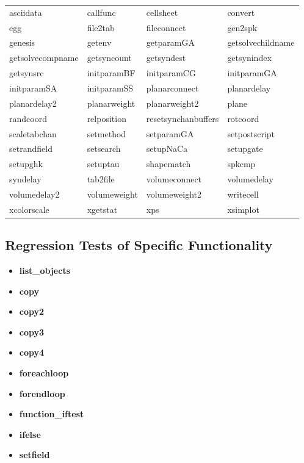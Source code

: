\documentclass[12pt]{article}
\begin{document}
\begin{tabular}{l l l l}
asciidata 			& callfunc 	& cellsheet 			& convert                             \\
egg 				& file2tab 		& fileconnect 			& gen2spk                           \\
genesis 			& getenv 		& getparamGA 			& getsolvechildname	\\
getsolvecompname	& getsyncount	& getsyndest 			& getsynindex			\\
getsynsrc 			& initparamBF	& initparamCG 			& initparamGA			\\
initparamSA 		& initparamSS	& planarconnect 		& planardelay			\\
planardelay2		& planarweight	& planarweight2 		& plane				\\
randcoord 		& relposition	& resetsynchanbuffers	& rotcoord				\\
scaletabchan 		& setmethod	& setparamGA 			& setpostscript			\\
setrandfield 		& setsearch	& setupNaCa 			& setupgate			\\
setupghk 			& setuptau	& shapematch 			& spkcmp				\\
syndelay 			& tab2file		& volumeconnect 		& volumedelay			\\
volumedelay2 		& volumeweight& volumeweight2 		& writecell				\\
xcolorscale 		& xgetstat 		& xps 				& xsimplot				\\
\end{tabular}

\subsection*{Regression Tests of Specific Functionality}
   \begin{itemize}
      \item[]{\bf list\_objects}
      \item[]{\bf copy}
      \item[]{\bf copy2}
      \item[]{\bf copy3}
      \item[]{\bf copy4}
      \item[]{\bf foreachloop}
      \item[]{\bf forendloop}
      \item[]{\bf function\_iftest}
      \item[]{\bf ifelse}
      \item[]{\bf setfield}
   \end{itemize}
   
\end{document}
